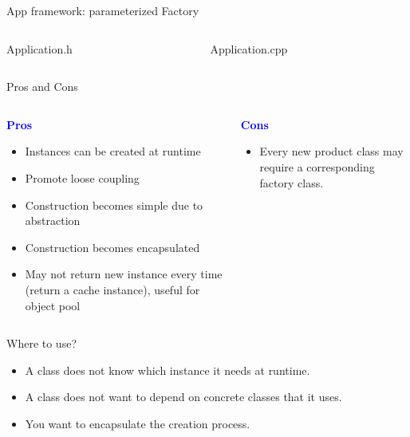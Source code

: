 \documentclass[13pt]{beamer}
\begin{document}
\begin{frame}{App framework: parameterized Factory}
\begin{columns}[T]
\begin{column}{.45\textwidth}
\lstset{basicstyle=\tiny,style=myCustomCppStyle}
Application.h

\end{column}

\begin{column}{.45\textwidth}
\lstset{basicstyle=\tiny,style=myCustomCppStyle}
Application.cpp

\end{column}
\end{columns}
\end{frame}
\fi

\begin{frame}{Pros and Cons}
\begin{columns}[T]
\begin{column}{.45\textwidth}
	\begin{center}
	\textcolor{blue}{\textbf{Pros}}
	\end{center}
	\begin{itemize}
		\item Instances can be created at runtime
		\item Promote loose coupling
		\item Construction becomes simple due to abstraction
		\item Construction becomes encapsulated
		\item May not return new instance every time (return a cache instance), useful for object pool
	\end{itemize}
\end{column}
\begin{column}{.45\textwidth}
	\begin{center}
	\textcolor{blue}{\textbf{Cons}}
	\end{center}
		\begin{itemize}
		\setlength\itemsep{1em}
		\item Every new product class may require a corresponding factory class.
	\end{itemize}
\end{column}
\end{columns}
\end{frame}

\begin{frame}{Where to use?}	
	\begin{itemize}
		\setlength\itemsep{1em}
		\item A class does not know which instance it needs at runtime.
		\item A class does not want to depend on concrete classes that it uses.
		\item You want to encapsulate the creation process.
	\end{itemize}
\end{frame}
\end{document}
